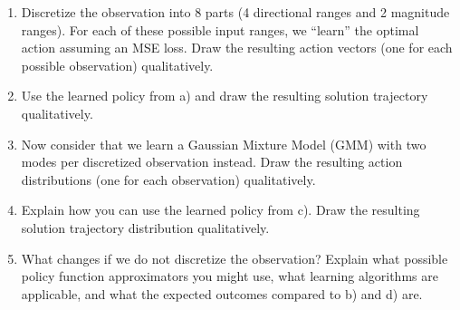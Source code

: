 \begin{enumerate}
\item Discretize the observation into 8 parts (4 directional ranges and 2 magnitude ranges). For each of these possible input ranges, we ``learn'' the optimal action assuming an MSE loss. Draw the resulting action vectors (one for each possible observation) qualitatively.



\item Use the learned policy from a) and draw the resulting solution trajectory qualitatively.

\item Now consider that we learn a Gaussian Mixture Model (GMM) with two modes per discretized observation instead. Draw the resulting action distributions (one for each observation) qualitatively.

\item Explain how you can use the learned policy from c). Draw the resulting solution trajectory distribution qualitatively.


\item What changes if we do not discretize the observation? Explain what possible policy function approximators you might use, what learning algorithms are applicable, and what the expected outcomes compared to b) and d) are.

\end{enumerate}









